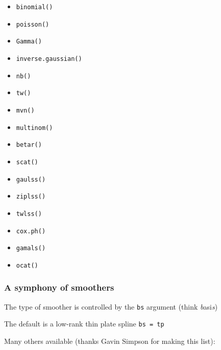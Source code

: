 \documentclass[
  openany]{book}
\begin{document}
\begin{itemize}
\item
  \texttt{binomial()}
\item
  \texttt{poisson()}
\item
  \texttt{Gamma()}
\item
  \texttt{inverse.gaussian()}
\item
  \texttt{nb()}
\item
  \texttt{tw()}
\item
  \texttt{mvn()}
\item
  \texttt{multinom()}
\item
  \texttt{betar()}
\item
  \texttt{scat()}
\item
  \texttt{gaulss()}
\item
  \texttt{ziplss()}
\item
  \texttt{twlss()}
\item
  \texttt{cox.ph()}
\item
  \texttt{gamals()}
\item
  \texttt{ocat()}
\end{itemize}

\hypertarget{a-symphony-of-smoothers}{%
\subsubsection{A symphony of smoothers}\label{a-symphony-of-smoothers}}

The type of smoother is controlled by the \texttt{bs} argument (think \emph{b}asi\emph{s})

The default is a low-rank thin plate spline \texttt{bs\ =\ \textquotesingle{}tp\textquotesingle{}}

Many others available (thanks Gavin Simpson for making this list):
\end{document}
